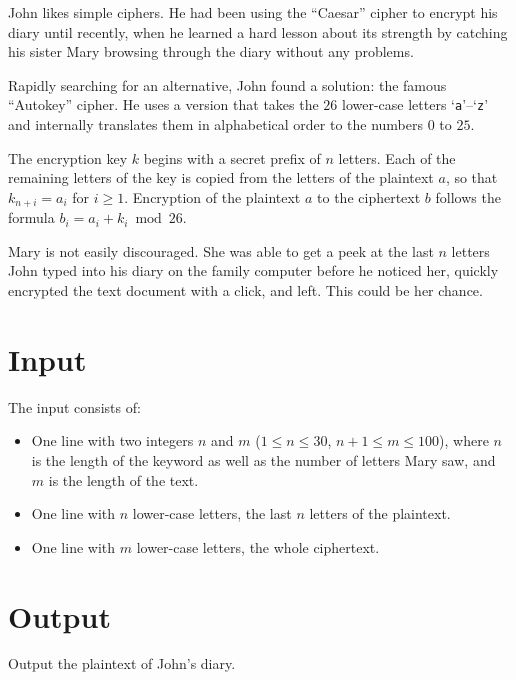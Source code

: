 John likes simple ciphers. He had been using the ``Caesar'' cipher to encrypt
his diary until recently, when he learned a hard lesson about its strength by
catching his sister Mary browsing through the diary without any problems.

Rapidly searching for an alternative, John found a solution: the famous ``Autokey''
cipher. He uses a version that takes the $26$ lower-case letters
`\texttt{a}'--`\texttt{z}' and internally translates them in alphabetical order to the numbers
$0$ to $25$.

The encryption key $k$ begins with a secret prefix of $n$ letters. Each
of the remaining letters of the key is copied from the letters of the
plaintext $a$, so that $k_{n+i} = a_{i}$ for $i \geq 1$. Encryption of
the plaintext $a$ to the ciphertext $b$ follows the formula
$b_i = a_i + k_i \bmod 26$.

Mary is not easily discouraged. She was able to get a peek at the last $n$
letters John typed into his diary on the family computer before he noticed her,
quickly encrypted the text document with a click, and left. This could be her
chance.

\section*{Input}
The input consists of:
\begin{itemize}
\item One line with two integers $n$ and $m$
      ($1 \le n \le 30$, $n + 1 \le m \le 100$),
where $n$ is the length of the keyword as well as the number of
letters Mary saw, and $m$ is the length of the text.
\item One line with $n$ lower-case letters, the last $n$ letters of the plaintext.
\item One line with $m$ lower-case letters, the whole ciphertext.
\end{itemize}

\section*{Output}

Output the plaintext of John's diary.
